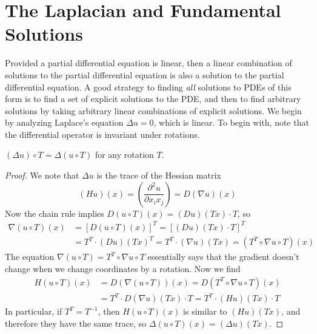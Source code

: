 \section{The Laplacian and Fundamental Solutions}

Provided a partial differential equation is linear, then a linear combination of solutions to the partial differential equation is also a solution to the partial differential equation. A good strategy to finding {\it all} solutions to PDEs of this form is to find a set of explicit solutions to the PDE, and then to find arbitrary solutions by taking arbitrary linear combinations of explicit solutions. We begin by analyzing Laplace's equation $\Delta u = 0$, which is linear. To begin with, note that the differential operator is invariant under rotations.

\begin{theorem}
    $(\Delta u) \circ T = \Delta (u \circ T)$ for any rotation $T$.
\end{theorem}
\begin{proof}
    We note that $\Delta u$ is the trace of the Hessian matrix
    \[ (Hu)(x) = \left( \frac{\partial^2 u}{\partial x_ix_j} \right) = D(\nabla u)(x) \]
    Now the chain rule implies $D(u \circ T)(x) = (Du)(Tx) \cdot T$, so
    \begin{align*}
        \nabla (u \circ T)(x) &= [D(u \circ T)(x)]^T = [(Du)(Tx) \cdot T]^T\\
        &= T^T \cdot (Du)(Tx)^T = T^T \cdot (\nabla u)(Tx) = (T^T \circ \nabla u \circ T)(x)
    \end{align*}
    The equation $\nabla (u \circ T) = T^T \circ \nabla u \circ T$ essentially says that the gradient doesn't change when we change coordinates by a rotation. Now we find
    \begin{align*}
        H(u \circ T)(x) &= D(\nabla (u \circ T))(x) = D(T^T \circ \nabla u \circ T)(x)\\
        &= T^T \cdot D(\nabla u)(Tx) \cdot T = T^T \cdot (Hu)(Tx) \cdot T
    \end{align*}
    In particular, if $T^T = T^{-1}$, then $H(u \circ T)(x)$ is similar to $(Hu)(Tx)$, and therefore they have the same trace, so $\Delta (u \circ T)(x) = (\Delta u) (Tx)$.
\end{proof}

